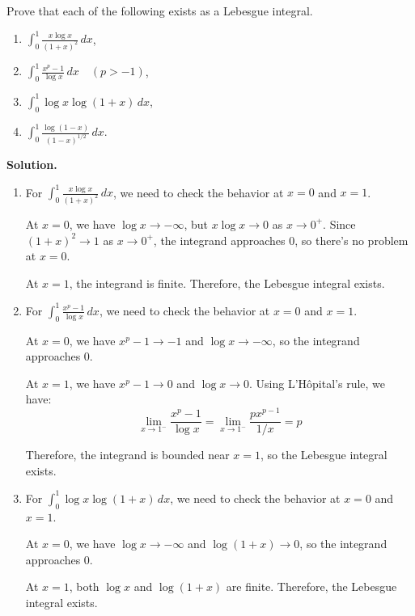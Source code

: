 \begin{problembox}
Prove that each of the following exists as a Lebesgue integral.
\begin{enumerate}[label=(\alph*)]
    \item $\int_{0}^{1} \frac{x \log x}{(1 + x)^2} \, dx$,
    \item $\int_{0}^{1} \frac{x^p - 1}{\log x} \, dx \quad (p > -1)$,
    \item $\int_{0}^{1} \log x \log (1 + x) \, dx$,
    \item $\int_{0}^{1} \frac{\log (1 - x)}{(1 - x)^{1/2}} \, dx.$
\end{enumerate}
\end{problembox}

\noindent\textbf{Solution.}
\begin{enumerate}[label=(\alph*)]
    \item For $\int_{0}^{1} \frac{x \log x}{(1 + x)^2} \, dx$, we need to check the behavior at $x = 0$ and $x = 1$.
    
    At $x = 0$, we have $\log x \to -\infty$, but $x \log x \to 0$ as $x \to 0^+$. Since $(1 + x)^2 \to 1$ as $x \to 0^+$, the integrand approaches 0, so there's no problem at $x = 0$.
    
    At $x = 1$, the integrand is finite. Therefore, the Lebesgue integral exists.
    
    \item For $\int_{0}^{1} \frac{x^p - 1}{\log x} \, dx$, we need to check the behavior at $x = 0$ and $x = 1$.
    
    At $x = 0$, we have $x^p - 1 \to -1$ and $\log x \to -\infty$, so the integrand approaches 0.
    
    At $x = 1$, we have $x^p - 1 \to 0$ and $\log x \to 0$. Using L'Hôpital's rule, we have:
    \[\lim_{x \to 1^-} \frac{x^p - 1}{\log x} = \lim_{x \to 1^-} \frac{px^{p-1}}{1/x} = p\]
    
    Therefore, the integrand is bounded near $x = 1$, so the Lebesgue integral exists.
    
    \item For $\int_{0}^{1} \log x \log (1 + x) \, dx$, we need to check the behavior at $x = 0$ and $x = 1$.
    
    At $x = 0$, we have $\log x \to -\infty$ and $\log (1 + x) \to 0$, so the integrand approaches 0.
    
    At $x = 1$, both $\log x$ and $\log (1 + x)$ are finite. Therefore, the Lebesgue integral exists.
    

\end{enumerate}
